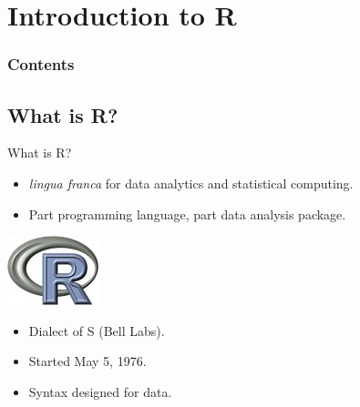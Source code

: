 \section[Intro to R]{Introduction to R}

\hidenum
\begin{frame}[noframenumbering]
\frametitle{Contents}
 \tableofcontents[currentsection,hideothersubsections,sectionstyle=show/hide]
\end{frame}
\shownum

\subsection{What is R?}


\begin{frame}
  \begin{block}{What is R?}\pause
  \begin{minipage}{.75\textwidth}
  \begin{itemize}[<+-|alert@+>]
    \item \emph{lingua franca} for data analytics and statistical computing.
    \item Part programming language, part data analysis package.
  \end{itemize}
  \end{minipage}
  \hfill
  \begin{minipage}{.2\textwidth}
    \centering\includegraphics[scale=2]{../common/pics/Rlogo}
  \end{minipage}
  \begin{itemize}
    \item Dialect of S (Bell Labs).
    \item Started May 5, 1976.
    \item Syntax designed for data.
  \end{itemize}
\end{block}
\end{frame}


